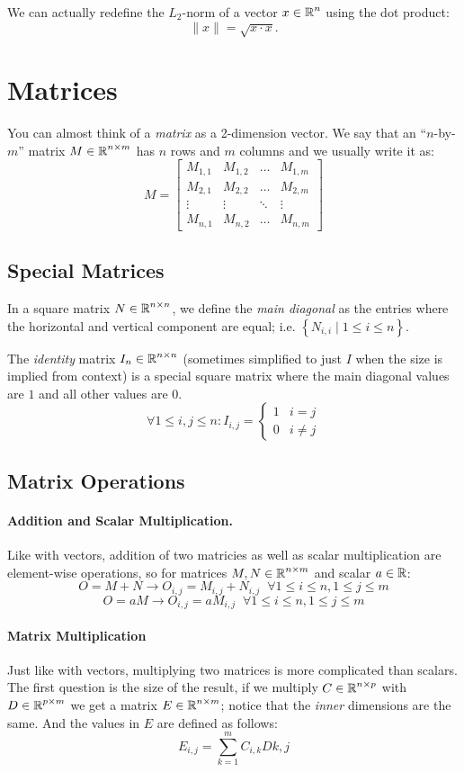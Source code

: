 \documentclass[11pt, oneside]{article}   	%
\begin{document}
We can actually redefine the $L_2$-norm of a vector $x\in\operatorname{\mathbb{R}}^n$ using the dot product:
\[
\|x\| = \sqrt{x \cdot x}.
\]
\section{Matrices}
You can almost think of a \emph{matrix} as a 2-dimension vector. 
We say that an ``$n$-by-$m$'' matrix $M \in \operatorname{\mathbb{R}}^{n\times m}$ has $n$ rows and $m$ columns and we usually write it as:
\[
M = \left[\begin{matrix}
M_{1,1}& 	M_{1,2}& 	\dots& M_{1,m}\\
M_{2,1}& 	M_{2,2}& 	\dots& M_{2,m}\\ 
\vdots & \vdots & \ddots & \vdots \\ 
M_{n,1}& 	M_{n,2}& 	\dots& M_{n,m}
\end{matrix}\right]
\]

\subsection{Special Matrices}
In a square matrix $N\in\operatorname{\mathbb{R}}^{n\times n}$, we define the \emph{main diagonal} as the entries where the horizontal and vertical component are equal; 
i.e. $\left\{N_{i,i} \mid 1 \le i \le n\right\}$. 

The \emph{identity} matrix $I_n \in\operatorname{\mathbb{R}}^{n\times n}$ (sometimes simplified to just $I$ when the size is implied from context) 
is a special square matrix where the main diagonal values are $1$ and all other values are $0$.
\[
\forall 1 \le i,j \le n : I_{i,j} = \begin{cases} 1 & i=j\\ 0 & i\ne j\end{cases}
\]
\subsection{Matrix Operations}
\paragraph{Addition and Scalar Multiplication.}
Like with vectors, addition of two matricies as well as scalar multiplication are element-wise operations, so for matrices $M,N \in \operatorname{\mathbb{R}}^{n\times m}$ and scalar $a\in\operatorname{\mathbb{R}}$:
\[O = M+N \rightarrow O_{i,j} = M_{i,j} + N_{i,j} \;\; \forall 1 \le i \le n, 1 \le j \le m\]
\[O = aM \rightarrow O_{i,j} = a M_{i,j} \;\; \forall 1 \le i \le n, 1 \le j \le m\]

\paragraph{Matrix Multiplication}
Just like with vectors, multiplying two matrices is more complicated than scalars. 
The first question is the size of the result, if we multiply $C \in \operatorname{\mathbb{R}}^{n\times p}$ with $D \in \operatorname{\mathbb{R}}^{p\times m}$ we get a matrix $E \in \operatorname{\mathbb{R}}^{n\times m}$;
notice that the \textit{inner} dimensions are the same.
And the values in $E$ are defined as follows:
\[
E_{i,j} = \sum_{k=1}^m C_{i,k}D{k,j}
\]
\end{document}
